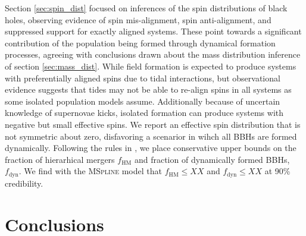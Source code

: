 Section \ref{sec:spin_dist} focused on inferences of the spin distributions of black holes, observing evidence of spin mis-alignment, spin anti-alignment, and suppressed support 
for exactly aligned systems. These point towards a significant contribution of the population being formed through dynamical formation processes, agreeing with 
conclusions drawn about the mass distribution inference of section \ref{sec:mass_dist}. While field formation is expected to produce systems with preferentially 
aligned spins due to tidal interactions, but observational evidence suggests that tides may not be able to re-align spins in all systems as some 
isolated population models assume. Additionally because of uncertain knowledge of supernovae kicks, isolated formation can produce systems with negative but small effective spins. 
We report an effective spin distribution that is not symmetric about zero, disfavoring a scenarior in wihch all BBHs are formed dynamically. Following the rules in \citet{Fishbach_2022}, 
we place conservative upper bounds on the fraction of hierarhical mergers $f_\mathrm{HM}$ and fraction of dynamically formed BBHs, $f_\mathrm{dyn}$. We find with 
the \textsc{MSpline} model that $f_\mathrm{HM} \leq XX$ and $f_\mathrm{dyn} \leq XX$ at 90\% credibility. 


\section{Conclusions}\label{sec:conclusion}

